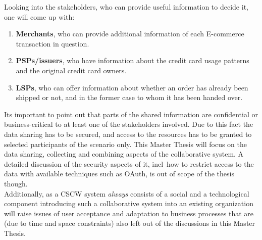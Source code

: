 Looking into the stakeholders, who can provide useful information to decide it, one will come up with:\@

\begin{enumerate}
    \item \textbf{Merchants}, who can provide additional information of each \gls{E-commerce} transaction in question.
    \item \textbf{\gls{PSP}s/issuers}, who have information about the credit card usage patterns and the original credit card owners.
    \item \textbf{\gls{LSP}s}, who can offer information about whether an order has already been shipped or not, and in the former case to whom it has been handed over.
\end{enumerate}

Its important to point out that parts of the shared information are confidential or business-critical to at least one of the stakeholders involved. Due to this fact the data sharing has to be secured, and access to the resources has to be granted to selected participants of the scenario only. This Master Thesis will focus on the data sharing, collecting and combining aspects of the collaborative system. A detailed discussion of the security aspects of it, \gls{incl}\ how to restrict access to the data with available techniques such as \gls{OAuth}, is out of scope of the thesis though.\\

Additionally, as a \gls{CSCW} system \emph{always} consists of a social and a technological component introducing such a collaborative system into an existing organization will raise issues of user acceptance and adaptation to business processes that are (due to time and space constraints) also left out of the discussions in this Master Thesis.

